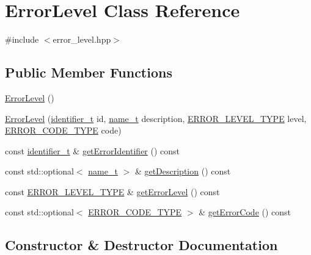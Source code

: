\hypertarget{classErrorLevel}{}\section{Error\+Level Class Reference}
\label{classErrorLevel}


{\ttfamily \#include $<$error\+\_\+level.\+hpp$>$}

\subsection*{Public Member Functions}
\begin{DoxyCompactItemize}
\item 
\hyperlink{classErrorLevel_a2a506dd351dd5f79b1f8cac435c95423}{Error\+Level} ()
\item 
\hyperlink{classErrorLevel_ae8999dee8b9cf6a27b545b705e031f40}{Error\+Level} (\hyperlink{general__types_8hpp_a824b78b06da8112c2772bc666a63638d}{identifier\+\_\+t} id, \hyperlink{structname__t}{name\+\_\+t} description, \hyperlink{apex__error_8h_aa4da4218c0e2dcb8c37ea7a6cb5bd515}{E\+R\+R\+O\+R\+\_\+\+L\+E\+V\+E\+L\+\_\+\+T\+Y\+PE} level, \hyperlink{apex__error_8h_a6c3334fe6390cd6a2e88e6a4aab5ffcc}{E\+R\+R\+O\+R\+\_\+\+C\+O\+D\+E\+\_\+\+T\+Y\+PE} code)
\item 
const \hyperlink{general__types_8hpp_a824b78b06da8112c2772bc666a63638d}{identifier\+\_\+t} \& \hyperlink{classErrorLevel_aeabf1a1b8868cb8c2dad90b4d9441ee5}{get\+Error\+Identifier} () const 
\item 
const std\+::optional$<$ \hyperlink{structname__t}{name\+\_\+t} $>$ \& \hyperlink{classErrorLevel_a9ca8a1d4ca9dc4360eafa7eb5c9d9c2f}{get\+Description} () const 
\item 
const \hyperlink{apex__error_8h_aa4da4218c0e2dcb8c37ea7a6cb5bd515}{E\+R\+R\+O\+R\+\_\+\+L\+E\+V\+E\+L\+\_\+\+T\+Y\+PE} \& \hyperlink{classErrorLevel_a794f6ce5cf346c11951539464bb742cf}{get\+Error\+Level} () const 
\item 
const std\+::optional$<$ \hyperlink{apex__error_8h_a6c3334fe6390cd6a2e88e6a4aab5ffcc}{E\+R\+R\+O\+R\+\_\+\+C\+O\+D\+E\+\_\+\+T\+Y\+PE} $>$ \& \hyperlink{classErrorLevel_aace829e4a499b5ec630b7ff1e2608853}{get\+Error\+Code} () const 
\end{DoxyCompactItemize}


\subsection{Constructor \& Destructor Documentation}
